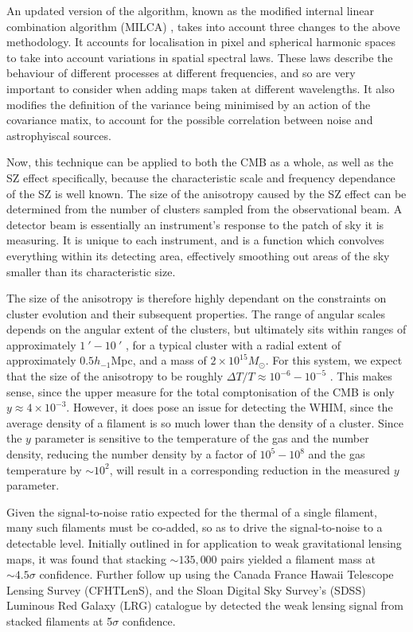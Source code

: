 An updated version of the algorithm, known as the modified internal linear combination algorithm (MILCA) \citep{2013A&A...558A.118H}, takes into account three changes to the above methodology. It accounts for localisation in pixel and spherical harmonic spaces to take into account variations in spatial spectral laws. These laws describe the behaviour of different processes at different frequencies, and so are very important to consider when adding maps taken at different wavelengths. It also modifies the definition of the variance being minimised by an action of the covariance matix, to account for the possible correlation between noise and astrophyiscal sources.

Now, this technique can be applied to both the CMB as a whole, as well as the SZ effect specifically, because the characteristic scale and frequency dependance of the SZ is well known.  The size of the anisotropy caused by the SZ effect can be determined from the number of clusters sampled from the observational beam. A detector beam is essentially an instrument's response to the patch of sky it is measuring. It is unique to each instrument, and is a function which convolves everything within its detecting area, effectively smoothing out areas of the sky smaller than its characteristic size.

\par The size of the anisotropy is therefore highly dependant on the constraints on cluster evolution and their subsequent properties. The range of angular scales depends on the angular extent of the clusters, but ultimately sits within ranges of approximately $\SI{1}{\arcmin} - \SI{10}{\arcmin}$ , for a typical cluster with a radial extent of approximately $0.5 h_{-1} $Mpc, and a mass of $2\times 10^{15} M_\odot$. For this system, we expect that the size of the anisotropy to be roughly $\Delta T/T \approx 10^{-6} - 10^{-5}$ \citep{1995ARA&A..33..541R}. This makes sense, since the upper measure for the total comptonisation of the CMB is only $y \approx 4\times 10^{-3}$. However, it does pose an issue for detecting the WHIM, since the average density of a filament is so much lower than the density of a cluster. Since the $y$ parameter is sensitive to the temperature of the gas and the number density, reducing the number density by a factor of $10^5-10^8$ and the gas temperature by $\sim 10^2$, will result in a corresponding reduction in the measured $y$ parameter. 

Given the signal-to-noise ratio expected for the thermal \sze of a single filament, many such filaments must be co-added, so as to drive the signal-to-noise to a detectable level. Initially outlined in \cite{2016MNRAS.457.2391C} for application to weak gravitational lensing maps, it was found that stacking $\sim 135,000$ pairs yielded a filament mass at $\sim 4.5 \sigma$ confidence. Further follow up using the Canada France Hawaii Telescope Lensing Survey (CFHTLenS), and the Sloan Digital Sky Survey's (SDSS) Luminous Red Galaxy (LRG) catalogue by \cite{2017MNRAS.468.2605E} detected the weak lensing signal from stacked filaments at 5$\sigma$ confidence.

